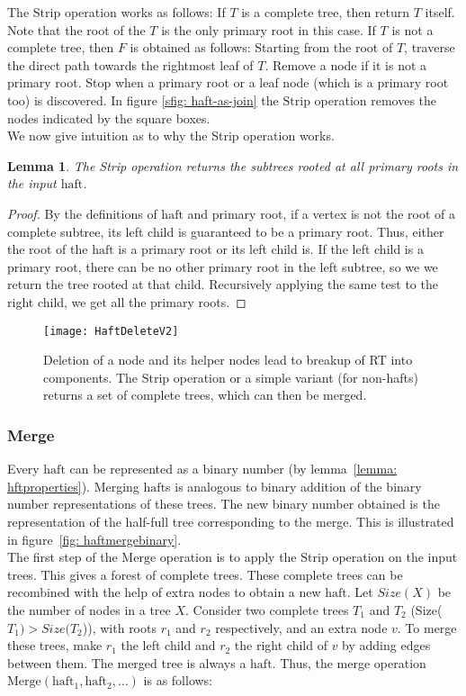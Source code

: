 \documentclass[11pt, letter]{article}
\newtheorem{lemma}{Lemma}
\newcommand{\haft}{\mathrm{haft}}
\newcommand{\Strip}{\mathrm{Strip}}
\newcommand{\Merge}{\mathrm{Merge}}
\begin{document}
The $\Strip$ operation works as follows: 
 If  $T$ is a complete tree, then return $T$ itself. Note that the root of the $T$ is the only primary root in this case. If $T$ is not a complete tree, then $F$ is obtained as follows: Starting from the root of $T$, traverse the  direct path towards the rightmost leaf of $T$. Remove a node if it is not a primary root. Stop when a primary root or a leaf node (which is a primary root too) is discovered. In figure \ref{sfig: haft-as-join} the $\Strip$ operation removes the nodes indicated by the square boxes. \\
We now give intuition as to why the Strip operation works.
\begin{lemma}
The Strip operation returns the subtrees rooted at all primary roots in the input $\haft$.
\end{lemma}
\begin{proof}
By the definitions of  $\haft$ and primary root, if a vertex is not the root of a complete subtree, its left
child is guaranteed to be a primary root. Thus, either the root of the $\haft$ is a primary root or its left child is. If
the left child is a primary root, there can be no other primary root in the left subtree, so we we return the tree rooted at that
child.  Recursively applying the same test to the right child, we get all the primary roots. 
\end{proof}

\begin{figure}[h!]
\centering
\texttt{[image: HaftDeleteV2]}
\caption{Deletion of a node and its helper nodes lead to breakup of RT into components. The Strip operation or a simple variant (for non-hafts) returns a set of complete trees, which can then be merged.} 
\label{fig: HaftStripMerge}
\end{figure}

\subsubsection{Merge}
\label{subsec: haftmerge}
 Every $\haft$ can be represented as a binary number (by lemma~\ref{lemma: hftproperties}).  Merging $\haft$s
is analogous to binary addition of the  binary number representations of these trees. The new binary number obtained is
the representation of the half-full tree corresponding to the merge. This is illustrated in figure~\ref{fig:
haftmergebinary}.\\
 The first step of the $\Merge$ operation is to apply the $\Strip$  operation on the input trees. This gives a forest of
complete trees.  These complete trees can be recombined with the help of extra nodes to obtain a new $\haft$. 
Let $Size(X)$ be the number of nodes in a tree $X$. Consider two complete trees
$T_1$ and $T_2$ (Size($T_1) > Size(T_2$)), with roots $r_{1}$ and $r_{2}$ respectively, and an extra node $v$. To merge
these trees, make $r_{1}$ the left child and $r_{2}$ the right child of $v$ by adding edges between them. The merged
tree is always a $\haft$.
 Thus, the merge operation $\Merge(\haft_1,\haft_2, \ldots)$ is as follows:\\
\end{document}

